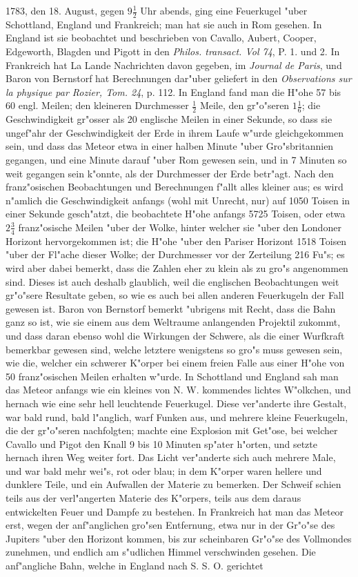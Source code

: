 \documentclass[a4paper, 11pt, oneside, polutonikogreek, german]{article}
\begin{document}
1783, den 18. August, gegen $\mathfrak{9\frac{1}{2}}$ Uhr abends, ging eine Feuerkugel "uber Schottland, England und Frankreich; man hat sie auch in Rom gesehen. In England ist sie beobachtet und beschrieben von Cavallo, Aubert, Cooper, Edgeworth, Blagden und Pigott in den \emph{Philos. transact. Vol 74}, P. 1. und 2. In Frankreich hat La Lande Nachrichten davon gegeben, im \emph{Journal de Paris}, und Baron von Bernstorf hat Berechnungen dar"uber geliefert in den \emph{Observations sur la physique par Rozier, Tom. 24}, p. 112. In England fand man die H"ohe 57 bis 60 engl. Meilen; den kleineren Durchmesser $\mathfrak{\frac{1}{2}}$ Meile, den gr"o"seren $\mathfrak{1\frac{1}{6}}$; die Geschwindigkeit gr"osser als 20 englische Meilen in einer Sekunde, so dass sie ungef"ahr der Geschwindigkeit der Erde in ihrem Laufe w"urde gleichgekommen sein, und dass das Meteor etwa in einer halben Minute "uber Gro"sbritannien gegangen, und eine Minute darauf "uber Rom gewesen sein, und in 7 Minuten so weit gegangen sein k"onnte, als der Durchmesser der Erde betr"agt. Nach den franz"osischen Beobachtungen und Berechnungen f"allt alles kleiner aus; es wird n"amlich die Geschwindigkeit anfangs (wohl mit Unrecht, nur) auf 1050 Toisen in einer Sekunde gesch"atzt, die beobachtete H"ohe anfangs 5725 Toisen, oder etwa $\mathfrak{2\frac{3}{4}}$ franz"osische Meilen "uber der Wolke, hinter welcher sie "uber den Londoner Horizont hervorgekommen ist; die H"ohe "uber den Pariser Horizont 1518 Toisen "uber der Fl"ache dieser Wolke; der Durchmesser vor der Zerteilung 216 Fu"s; es wird aber dabei bemerkt, dass die Zahlen eher zu klein als zu gro"s angenommen sind. Dieses ist auch deshalb glaublich, weil die englischen Beobachtungen weit gr"o"sere Resultate geben, so wie es auch bei allen anderen Feuerkugeln der Fall gewesen ist. Baron von Bernstorf bemerkt "ubrigens mit Recht, dass die Bahn ganz so ist, wie sie einem aus dem Weltraume anlangenden Projektil zukommt, und dass daran ebenso wohl die Wirkungen der Schwere, als die einer Wurfkraft bemerkbar gewesen sind, welche letztere wenigstens so gro"s muss gewesen sein, wie die, welcher ein schwerer K"orper bei einem freien Falle aus einer H"ohe von 50 franz"osischen Meilen erhalten w"urde. In Schottland und England sah man das Meteor anfangs wie ein kleines von N. W. kommendes lichtes W"olkchen, und hernach wie eine sehr hell leuchtende Feuerkugel. Diese ver"anderte ihre Gestalt, war bald rund, bald l"anglich, warf Funken aus, und mehrere kleine Feuerkugeln, die der gr"o"seren nachfolgten; machte eine Explosion mit Get"ose, bei welcher Cavallo und Pigot den Knall 9 bis 10 Minuten sp"ater h"orten, und setzte hernach ihren Weg weiter fort. Das Licht ver"anderte sich auch mehrere Male, und war bald mehr wei"s, rot oder blau; in dem K"orper waren hellere und dunklere Teile, und ein Aufwallen der Materie zu bemerken. Der Schweif schien teils aus der verl"angerten Materie des K"orpers, teils aus dem daraus entwickelten Feuer und Dampfe zu bestehen. In Frankreich hat man das Meteor erst, wegen der anf"anglichen gro"sen Entfernung, etwa nur in der Gr"o"se des Jupiters "uber den Horizont kommen, bis zur scheinbaren Gr"o"se des Vollmondes zunehmen, und endlich am s"udlichen Himmel verschwinden gesehen. Die anf"angliche Bahn, welche in England nach S. S. O. gerichtet 
\end{document}
